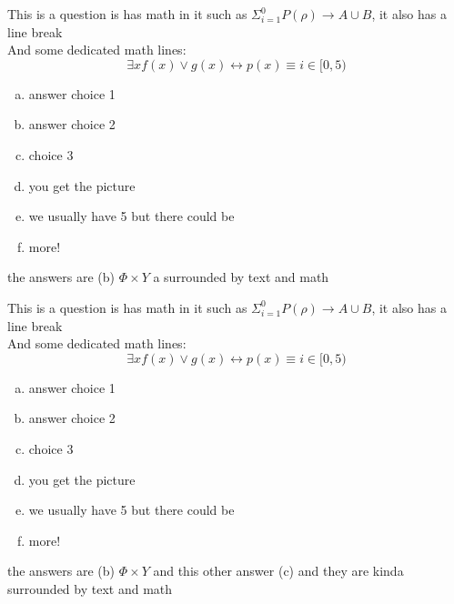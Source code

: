 



This is a question is has math in it such as $\Sigma_{i=1}^0 P(\rho) \rightarrow A \cup B $,
it also has a line break\\
And some dedicated math lines:
\[\exists x f(x) \lor g(x) \leftrightarrow p(x) \equiv i \in [0,5) \]

\begin{enumerate}[a)]
    \item answer choice 1
    \item answer choice 2
    \item choice 3
    \item you get the picture
    \item we usually have 5 but there could be
    \item more!
\end{enumerate}

\begin{solution}
the answers are (b) $\Phi \times Y$ a surrounded by text and math
\end{solution}


This is a question is has math in it such as $\Sigma_{i=1}^0 P(\rho) \rightarrow A \cup B $,
it also has a line break\\
And some dedicated math lines:
\[\exists x f(x) \lor g(x) \leftrightarrow p(x) \equiv i \in [0,5) \]

\begin{enumerate}[a)]
    \item answer choice 1
    \item answer choice 2
    \item choice 3
    \item you get the picture
    \item we usually have 5 but there could be
    \item more!
\end{enumerate}

\begin{solution}
the answers are (b) $\Phi \times Y$ and this other answer (c) and they are kinda surrounded by text and math
\end{solution}



